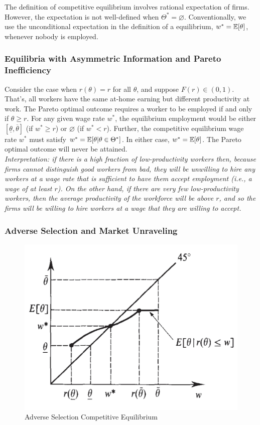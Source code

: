 \documentclass{report}
\begin{document}
		\begin{remark}
			The definition of competitive equilibrium involves rational expectation of firms. However, the expectation is not well-defined when $\Theta^* = \varnothing$. Conventionally, we use the unconditional expectation in the definition of a equilibrium, $w^* = \mathbb{E}[{\theta}]$, whenever nobody is employed.
		\end{remark}
		
		\subsubsection{Equilibria with Asymmetric Information and Pareto Inefficiency}
		\begin{example}
			Consider the case when $r(\theta) = r$ for all $\theta$, and suppose $F(r) \in (0, 1)$. That's, all workers have the same at-home earning but different productivity at work. The Pareto optimal outcome requires a worker to be employed if and only if $\theta \geq r$. For any given wage rate $w^*$, the equilibrium employment would be either $[\underline{\theta}, \overline{\theta}]$ (if $w^* \geq r$) or $\varnothing$ (if $w^* < r$). Further, the competitive equilibrium wage rate $w^*$ must satisfy $w^* = \mathbb{E}[{\theta|\theta \in \Theta^*}]$. In either case, $w^* = \mathbb{E}[{\theta}]$. The Pareto optimal outcome will never be attained.\\
			\emph{Interpretation: if there is a high fraction of low-productivity workers then, because firms cannot distinguish good workers from bad, they will be unwilling to hire any workers at a wage rate that is sufficient to have them accept employment (i.e., a wage of at least $r$). On the other hand, if there are very few low-productivity workers, then the average productivity of the workforce will be above $r$, and so the firms will be willing to hire workers at a wage that they are willing to accept.}
		\end{example}
		
		\subsubsection{Adverse Selection and Market Unraveling}
		\begin{figure}[h]
			\centering
			\includegraphics[width=0.4\linewidth]{figures/adverse_selection}
			\caption{Adverse Selection Competitive Equilibrium}
		\end{figure}		
\end{document}
